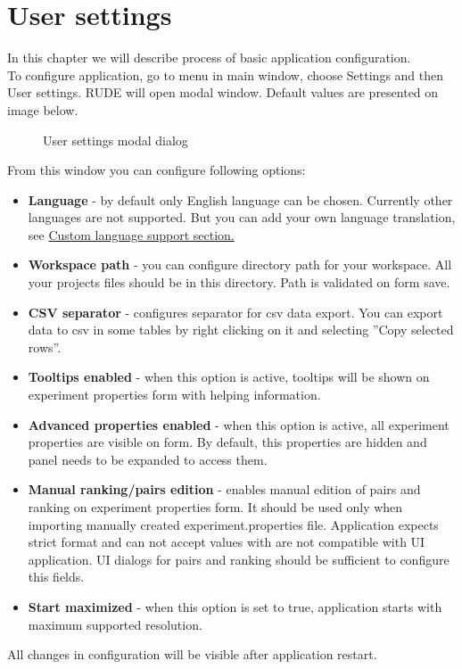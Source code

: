 \section{User settings}\label{section:user-settings}

In this chapter we will describe process of basic application configuration.\\

To configure application, go to menu in main window, choose Settings and then User settings. RUDE will open modal window. Default values are presented on image below.

\begin{figure*}[!ht] 
	\centering
	\caption{User settings modal dialog}
\end{figure*}


From this window you can configure following options:
\begin{itemize}
	\item \textbf{Language} - by default only English language can be chosen. Currently other languages are not supported. But you can add your own language translation, see \hyperref[sub:config-labels]{Custom language support section.}
	\item \textbf{Workspace path} - you can configure directory path for your workspace. All your projects files should be in this directory. Path is validated on form save.
	\item \textbf{CSV separator} - configures separator for csv data export. You can export data to csv in some tables by right clicking on it and selecting ''Copy selected rows''.
	\item \textbf{Tooltips enabled} - when this option is active, tooltips will be shown on experiment properties form with helping information.
	\item \textbf{Advanced properties enabled} - when this option is active, all experiment properties are visible on form. By default, this properties are hidden and panel needs to be expanded to access them.
	\item \textbf{Manual ranking/pairs edition} - enables manual edition of pairs and ranking on experiment properties form. It should be used only when importing manually created experiment.properties file. Application expects strict format and can not accept values with are not compatible with UI application. UI dialogs for pairs and ranking should be sufficient to configure this fields.
	\item \textbf{Start maximized} - when this option is set to true, application starts with maximum supported resolution.
\end{itemize}

All changes in configuration will be visible after application restart.


\vfill\newpage